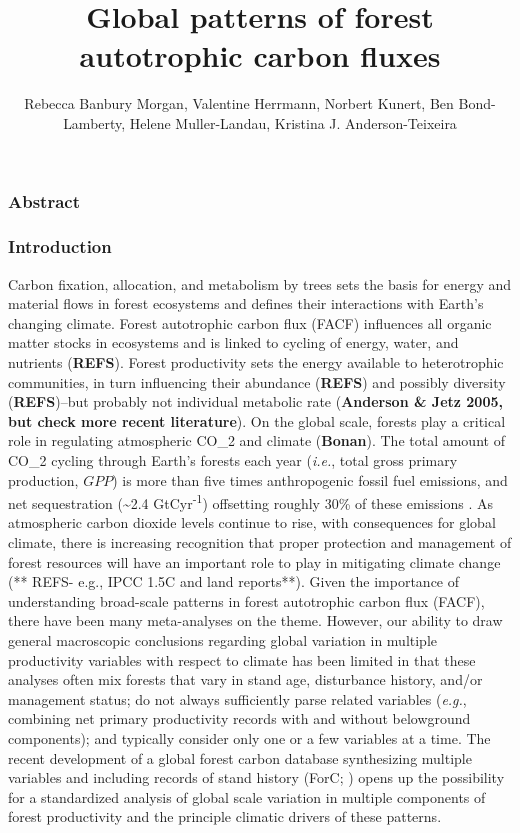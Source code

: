 \documentclass[]{article}
\title{Global patterns of forest autotrophic carbon fluxes}
\author{Rebecca Banbury Morgan, Valentine Herrmann, Norbert Kunert, Ben
Bond-Lamberty, Helene Muller-Landau, Kristina J. Anderson-Teixeira}
\date{}
\begin{document}
\maketitle

\subsubsection{Abstract}\label{abstract}

\subsubsection{Introduction}\label{introduction}

Carbon fixation, allocation, and metabolism by trees sets the basis for
energy and material flows in forest ecosystems and defines their
interactions with Earth's changing climate. Forest autotrophic carbon
flux (FACF) influences all organic matter stocks in ecosystems and is
linked to cycling of energy, water, and nutrients (\textbf{REFS}).
Forest productivity sets the energy available to heterotrophic
communities, in turn influencing their abundance (\textbf{REFS}) and
possibly diversity (\textbf{REFS})--but probably not individual
metabolic rate (\textbf{Anderson \& Jetz 2005, but check more recent
literature}). On the global scale, forests play a critical role in
regulating atmospheric CO\_2 and climate (\textbf{Bonan}). The total
amount of CO\_2 cycling through Earth's forests each year (\emph{i.e.},
total gross primary production, \(GPP\)) is more than five times
anthropogenic fossil fuel emissions, and net sequestration
(\textasciitilde{}2.4 GtCyr\textsuperscript{-1}) offsetting roughly 30\%
of these emissions \citep{pan_large_2011}. As atmospheric carbon dioxide
levels continue to rise, with consequences for global climate, there is
increasing recognition that proper protection and management of forest
resources will have an important role to play in mitigating climate
change (** REFS- e.g., IPCC 1.5C and land reports**). Given the
importance of understanding broad-scale patterns in forest autotrophic
carbon flux (FACF), there have been many meta-analyses on the theme.
However, our ability to draw general macroscopic conclusions regarding
global variation in multiple productivity variables with respect to
climate has been limited in that these analyses often mix forests that
vary in stand age, disturbance history, and/or management status; do not
always sufficiently parse related variables (\emph{e.g.}, combining net
primary productivity records with and without belowground components);
and typically consider only one or a few variables at a time. The recent
development of a global forest carbon database synthesizing multiple
variables and including records of stand history (ForC;
\citep{anderson-teixeira_carbon_2016, anderson-teixeira_forc:_2018})
opens up the possibility for a standardized analysis of global scale
variation in multiple components of forest productivity and the
principle climatic drivers of these patterns.
\end{document}
